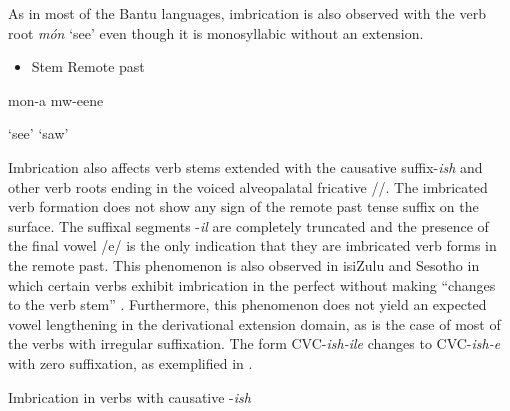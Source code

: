 \documentclass[output=paper]{langsci/langscibook}
\begin{document}
As in most of the Bantu languages, imbrication is also observed with the verb root \emph{món} ‘see’ even though it is monosyllabic without an extension. 

\begin{itemize}
\item \begin{stylelsLanginfo}
   Stem          Remote past
\end{stylelsLanginfo}\end{itemize}
\begin{stylelsSourceline}
    mon-a          mw-eene  
\end{stylelsSourceline}

\begin{stylelsTranslation}
‘see’          ‘saw’
\end{stylelsTranslation}

Imbrication also affects verb stems extended with the causative suffix-\emph{ish} and other verb roots ending in the voiced alveopalatal fricative //. The imbricated verb formation does not show any sign of the remote past tense suffix on the surface. The suffixal segments -\emph{il} are completely truncated and the presence of the final vowel /e/ is the only indication that they are imbricated verb forms in the remote past. This phenomenon is also observed in isiZulu and Sesotho in which certain verbs exhibit imbrication in the perfect without making “changes to the verb stem” \citep{Monich2015}. Furthermore, this phenomenon does not yield an expected vowel lengthening in the derivational extension domain, as is the case of most of the verbs with irregular suffixation. The form CVC-\emph{ish-ile} changes to CVC-\emph{ish-e} with zero suffixation, as exemplified in .

\begin{stylelsTableHeading}%
\begin{table}
\caption{Imbrication in verbs with causative -\emph{ish}}
\label{tab:24}
\end{table}\end{stylelsTableHeading}
\end{document}
